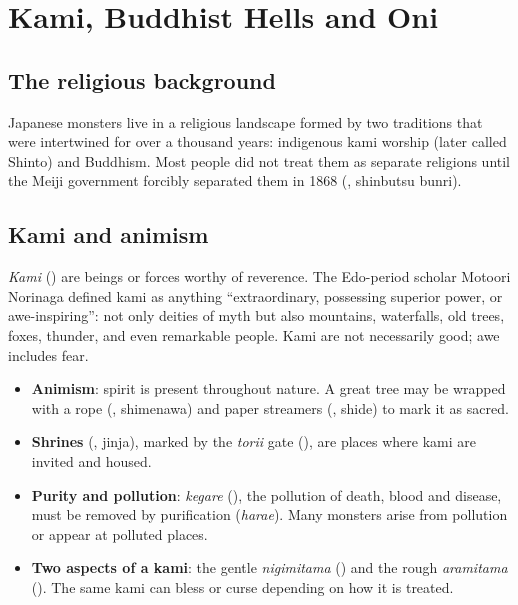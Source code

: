 \chapter{Kami, Buddhist Hells and Oni}

\section{The religious background}

Japanese monsters live in a religious landscape formed by two traditions that were
intertwined for over a thousand years: indigenous kami worship (later called Shinto) and
Buddhism. Most people did not treat them as separate religions until the Meiji government
forcibly separated them in 1868 (, shinbutsu bunri).

\section{Kami and animism}

\begin{definition}[Kami]
\emph{Kami} () are beings or forces worthy of reverence. The Edo-period scholar
Motoori Norinaga defined kami as anything ``extraordinary, possessing superior power,
or awe-inspiring'': not only deities of myth but also mountains, waterfalls, old trees,
foxes, thunder, and even remarkable people. Kami are not necessarily good; awe includes
fear.
\end{definition}

\begin{itemize}
  \item \textbf{Animism}: spirit is present throughout nature. A great tree may be wrapped
        with a rope (, shimenawa) and paper streamers (, shide) to mark it
        as sacred.
  \item \textbf{Shrines} (, jinja), marked by the \emph{torii} gate (),
        are places where kami are invited and housed.
  \item \textbf{Purity and pollution}: \emph{kegare} (), the pollution of death,
        blood and disease, must be removed by purification (\emph{harae}). Many monsters
        arise from pollution or appear at polluted places.
  \item \textbf{Two aspects of a kami}: the gentle \emph{nigimitama} () and the rough
        \emph{aramitama} (). The same kami can bless or curse depending on how it
        is treated.
\end{itemize}

